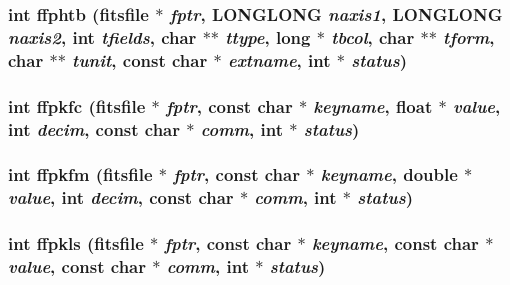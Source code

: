 \subsubsection{\setlength{\rightskip}{0pt plus 5cm}int ffphtb (\bf{fitsfile} $\ast$ {\em fptr}, \bf{LONGLONG} {\em naxis1}, \bf{LONGLONG} {\em naxis2}, int {\em tfields}, char $\ast$$\ast$ {\em ttype}, long $\ast$ {\em tbcol}, char $\ast$$\ast$ {\em tform}, char $\ast$$\ast$ {\em tunit}, const char $\ast$ {\em extname}, int $\ast$ {\em status})}\label{test_2shm__client_2fitsio_8h_97379ac653d2586699812086d52ad054}


\subsubsection{\setlength{\rightskip}{0pt plus 5cm}int ffpkfc (\bf{fitsfile} $\ast$ {\em fptr}, const char $\ast$ {\em keyname}, float $\ast$ {\em value}, int {\em decim}, const char $\ast$ {\em comm}, int $\ast$ {\em status})}\label{test_2shm__client_2fitsio_8h_f1222f8c91c04a9b03d9e11c5b199ea4}


\subsubsection{\setlength{\rightskip}{0pt plus 5cm}int ffpkfm (\bf{fitsfile} $\ast$ {\em fptr}, const char $\ast$ {\em keyname}, double $\ast$ {\em value}, int {\em decim}, const char $\ast$ {\em comm}, int $\ast$ {\em status})}\label{test_2shm__client_2fitsio_8h_1471beac55097602f6765917a191683b}


\subsubsection{\setlength{\rightskip}{0pt plus 5cm}int ffpkls (\bf{fitsfile} $\ast$ {\em fptr}, const char $\ast$ {\em keyname}, const char $\ast$ {\em value}, const char $\ast$ {\em comm}, int $\ast$ {\em status})}\label{test_2shm__client_2fitsio_8h_51811c05fbd0c303b0ca07d0a78e6674}


